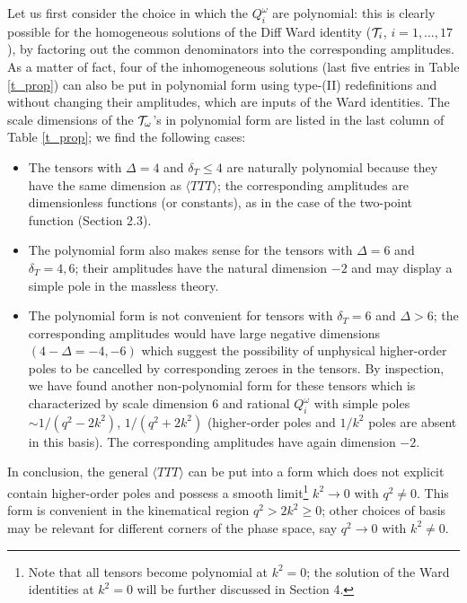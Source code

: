 \documentclass[11pt]{article}
\def\o{\omega}
\def\bra{\langle}
\def\ket{\rangle}
\def\dt{{\delta_T}} %
\begin{document}
Let us first consider the choice in which the $Q_i^\o$ are polynomial:
this is clearly possible for the homogeneous solutions of the 
Diff Ward identity (${\cal T}_i$, $i=1,\dots,17$), 
by factoring out the common denominators into the corresponding amplitudes. 
As a matter of fact, four of the inhomogeneous solutions
(last five entries in Table \ref{t_prop}) can also be put in 
polynomial form using type-(II) redefinitions and without 
changing their amplitudes, which are inputs of the Ward identities. 
The scale dimensions of the ${\cal T}_\omega$'s in polynomial form are listed
in the last column of Table \ref{t_prop}; we find the following cases:
\begin{itemize}
\item
The tensors with $\Delta =4$ and $\dt \le 4$  are naturally polynomial
because they have the same dimension as $\bra TTT\ket$;
the corresponding amplitudes are dimensionless functions (or constants),
as in the case of the two-point function (Section 2.3).
\item
The polynomial form also makes sense for the tensors with 
$\Delta=6$ and $\dt=4,6$; their amplitudes have the natural dimension $-2$
and may display a simple pole in the massless theory.
\item
The polynomial form is not convenient for
tensors with $\dt=6$ and $\Delta >6$;
the corresponding amplitudes would have large negative dimensions 
$(4-\Delta=-4,-6)$ which suggest the possibility of unphysical 
higher-order poles to be cancelled by corresponding zeroes in the tensors. 
By inspection, we have found another non-polynomial form
for these tensors which is characterized by scale dimension $6$ 
and rational $Q_i^\o$ 
with simple poles $\sim 1/(q^2 - 2 k^2 )$, $1/(q^2 + 2 k^2 )$
(higher-order poles and $1/k^2$ poles are absent in this basis).
The corresponding amplitudes have again dimension $-2$.
\end{itemize}
In conclusion, the general $\bra TTT\ket$ can be put into a
form which does not explicit contain higher-order poles 
and possess a smooth limit\footnote{ 
Note that all tensors become polynomial at $k^2=0$; the solution of the
Ward identities at $k^2=0$  will be further discussed in Section 4.}
$k^2\to 0$ with $q^2\neq 0$.
This form is convenient in the kinematical region $q^2 > 2k^2 \ge 0$;
other choices of basis may be relevant for different corners
of the phase space, say $q^2 \to 0$ with $k^2\neq 0$. 

\bigskip
\end{document}
